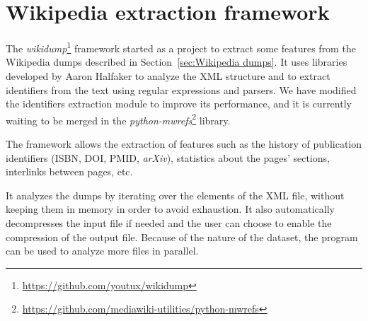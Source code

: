 \section{Wikipedia extraction framework}
\label{sub:contrib_programs_framework}
The \emph{wikidump}\footnote{\url{https://github.com/youtux/wikidump}} framework started as a project to extract some features from the Wikipedia dumps described in Section~\ref{sec:Wikipedia dumps}.
It uses libraries developed by Aaron Halfaker to analyze the XML structure and to extract identifiers from the text using regular expressions and parsers.
We have modified the identifiers extraction module to improve its performance, and it is currently waiting to be merged in the \emph{python-mwrefs}\footnote{\url{https://github.com/mediawiki-utilities/python-mwrefs}} library.

The framework allows the extraction of features such as the history of publication identifiers (\ac{ISBN}, \ac{DOI}, \ac{PMID}, \emph{arXiv}), statistics about the pages' sections, interlinks between pages, etc.

It analyzes the dumps by iterating over the elements of the XML file, without keeping them in memory in order to avoid exhaustion.
It also automatically decompresses the input file if needed and the user can choose to enable the compression of the output file.
Because of the nature of the dataset, the program can be used to analyze more files in parallel.
